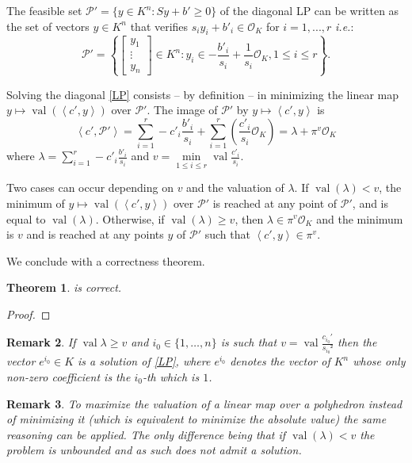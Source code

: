 \documentclass[a4paper,oneside,11pt]{article}
\newtheorem{theorem}{Theorem}[section]
\newtheorem{remark}[theorem]{Remark}
\newcommand{\PP}{\mathcal{P}}
\DeclareMathOperator{\val}{val}
\newcommand{\OK}{\mathcal{O}_K}
\begin{document}
The feasible set $\PP' = \{y \in K^n : Sy+b' \geq 0\}$ of the diagonal LP can be written as the set of vectors
$y \in K^n$ that verifies $s_i y_i + b'_i \in \OK$ for $i=1,...,r$ {\it i.e.}:
$$
\PP' = \left\{\left[\begin{smallmatrix} y_1\\ \vdots\\ y_n \end{smallmatrix}\right] \in K^n :
y_i \in -\frac{b'_i}{s_i} + \frac{1}{s_i} \OK, 1\le i\le r\right\}.
$$

Solving the diagonal \eqref{LP} consists -- by definition -- in minimizing the linear map $y \mapsto \val\left(\left\langle
c',y \right\rangle\right)$ over $\PP'$. The image of $\PP'$ by $y \mapsto \left\langle c',y \right\rangle$ is
\[
\left\langle c',\PP' \right\rangle = \sum_{i=1}^r -c'_i \frac{b'_i}{s_i} + \sum_{i=1}^r\left( \frac{c'_i}{s_{i}} \OK \right) = \lambda + \pi^{v} \OK
\]
where $\lambda = \sum_{i=1}^r -c'_i \frac{b'_i}{s_i}$ and $v = \min\limits_{1\le i\le r} \val \frac{c'_{i}}{s_{i}} $.

Two cases can occur depending on $v$ and the valuation of $\lambda$.
If $\val(\lambda) < v$, the minimum of $y\mapsto \val\left(\left\langle c',y \right\rangle\right)$ over $\PP'$
  is reached at any point of $\PP'$, and is equal to $\val(\lambda)$.
  Otherwise, if $\val(\lambda) \ge v$, then $\lambda \in \pi^{v} \OK$ and the minimum is $v$ and is reached at any points $y$
  of $\PP'$ such that $\left<c',y \right> \in \pi^v$.

  We conclude with a correctness theorem.
  
  \begin{theorem}  is correct.
  \end{theorem}
  \begin{proof}
  \end{proof}
  
\begin{remark}
	If $\val \lambda \ge v$ and $i_0 \in \{1,\ldots, n\} $ is such that $v = \val \frac{c_{i_0}'}{s_{i_0}²} $ 
  then the vector $e^{i_0} \in K$ is a solution of \ref{LP}, 
  where $e^{i_0}$ denotes the vector of $K^n$ whose only non-zero coefficient is the $i_0$-th which is $1$.
\end{remark}

\begin{remark}
To maximize the valuation of a linear map over a polyhedron instead of minimizing it 
(which is equivalent to minimize the absolute value) the same reasoning can be applied. 
The only difference being that if $\val\left( \lambda\right) < v$ the problem is unbounded
and as such does not admit a solution. 
\end{remark}
\end{document}

